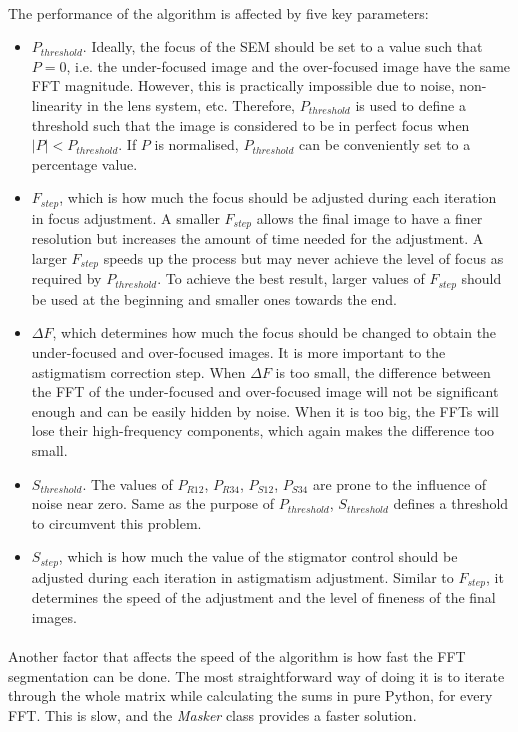 \documentclass[12pt, twocolumn]{report}
\begin{document}
\paragraph{}
The performance of the algorithm is affected by five key parameters:
\begin{itemize}
    \item $P_{threshold}$. Ideally, the focus of the SEM should be set to a value such that $P = 0$, i.e. the under-focused image and the over-focused image have the same FFT magnitude. However, this is practically impossible due to noise, non-linearity in the lens system, etc. Therefore, $P_{threshold}$ is used to define a threshold such that the image is considered to be in perfect focus when $|P| < P_{threshold}$. If $P$ is normalised, $P_{threshold}$ can be conveniently set to a percentage value.
    \item $F_{step}$, which is how much the focus should be adjusted during each iteration in focus adjustment. A smaller $F_{step}$ allows the final image to have a finer resolution but increases the amount of time needed for the adjustment. A larger $F_{step}$ speeds up the process but may never achieve the level of focus as required by $P_{threshold}$. To achieve the best result, larger values of $F_{step}$ should be used at the beginning and smaller ones towards the end.
    \item $\Delta F$, which determines how much the focus should be changed to obtain the under-focused and over-focused images. It is more important to the astigmatism correction step. When $\Delta F$ is too small, the difference between the FFT of the under-focused and over-focused image will not be significant enough and can be easily hidden by noise. When it is too big, the FFTs will lose their high-frequency components, which again makes the difference too small.
    \item $S_{threshold}$. The values of $P_{R12}$, $P_{R34}$, $P_{S12}$, $P_{S34}$ are prone to the influence of noise near zero. Same as the purpose of $P_{threshold}$, $S_{threshold}$ defines a threshold to circumvent this problem.
    \item $S_{step}$, which is how much the value of the stigmator control should be adjusted during each iteration in astigmatism adjustment. Similar to $F_{step}$, it determines the speed of the adjustment and the level of fineness of the final images.
\end{itemize}

\paragraph{}
Another factor that affects the speed of the algorithm is how fast the FFT segmentation can be done. The most straightforward way of doing it is to iterate through the whole matrix while calculating the sums in pure Python, for every FFT. This is slow, and the \textit{Masker} class provides a faster solution.
\end{document}
